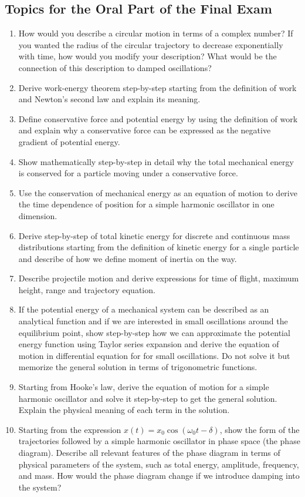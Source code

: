 \documentclass[11pt]{article}
\begin{document}
\subsection*{Topics for the Oral Part of the Final Exam}
\begin{enumerate}
	\item How would you describe a circular motion in terms of a complex number? If you wanted the radius of the circular trajectory to decrease exponentially with time, how would you modify your description? What would be the connection of this description to damped oscillations?
	\item Derive work-energy theorem step-by-step starting from the definition of work and Newton's second law and explain its meaning.
	\item Define conservative force and potential energy by using the definition of work and explain why a conservative force can be expressed as the negative gradient of potential energy.
	\item Show mathematically step-by-step in detail why the total mechanical energy is conserved for a particle moving under a conservative force. 
	\item Use the conservation of mechanical energy as an equation of motion to derive the time dependence of position for a simple harmonic oscillator in one dimension.
	\item Derive step-by-step of total kinetic energy for discrete and continuous mass distributions starting from the definition of kinetic energy for a single particle and describe of how we define moment of inertia on the way.
	\item Describe projectile motion and derive expressions for time of flight, maximum height, range and trajectory equation.
	\item If the potential energy of a mechanical system can be described as an analytical function and if we are interested in small oscillations around the equilibrium point, show step-by-step how we can approximate the potential energy function using Taylor series expansion and derive the equation of motion in differential equation for for small oscillations. Do not solve it but memorize the general solution in terms of trigonometric functions.
	\item Starting from Hooke's law, derive the equation of motion for a simple harmonic oscillator and solve it step-by-step to get the general solution. Explain the physical meaning of each term in the solution.
	\item Starting from the expression $x(t)=x_0\cos{(\omega_0 t-\delta)}$, show the form of the trajectories followed by a simple harmonic oscillator in phase space (the phase diagram). Describe all relevant features of the phase diagram in terms of physical parameters of the system, such as total energy, amplitude, frequency, and mass. How would the phase diagram change if we introduce damping into the system?

\end{enumerate}
\end{document}
